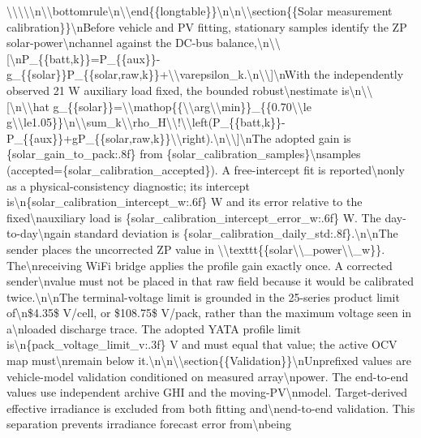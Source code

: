 \documentclass[a4paper,11pt]{article}
\begin{document}
\begin{enumerate}[leftmargin=1.8em]
\textbackslash{}\textbackslash{}\textbackslash{}\textbackslash{}\textbackslash{}n\textbackslash{}\textbackslash{}bottomrule\textbackslash{}n\textbackslash{}\textbackslash{}end\{\{longtable\}\}\textbackslash{}n\textbackslash{}n\textbackslash{}\textbackslash{}section\{\{Solar measurement calibration\}\}\textbackslash{}nBefore vehicle and PV fitting, stationary samples identify the ZP solar-power\textbackslash{}nchannel against the DC-bus balance,\textbackslash{}n\textbackslash{}\textbackslash{}[\textbackslash{}nP\_\{\{batt,k\}\}=P\_\{\{aux\}\}-g\_\{\{solar\}\}P\_\{\{solar,raw,k\}\}+\textbackslash{}\textbackslash{}varepsilon\_k.\textbackslash{}n\textbackslash{}\textbackslash{}]\textbackslash{}nWith the independently observed 21 W auxiliary load fixed, the bounded robust\textbackslash{}nestimate is\textbackslash{}n\textbackslash{}\textbackslash{}[\textbackslash{}n\textbackslash{}\textbackslash{}hat g\_\{\{solar\}\}=\textbackslash{}\textbackslash{}mathop\{\{\textbackslash{}\textbackslash{}arg\textbackslash{}\textbackslash{}min\}\}\_\{\{0.70\textbackslash{}\textbackslash{}le g\textbackslash{}\textbackslash{}le1.05\}\}\textbackslash{}n\textbackslash{}\textbackslash{}sum\_k\textbackslash{}\textbackslash{}rho\_H\textbackslash{}\textbackslash{}!\textbackslash{}\textbackslash{}left(P\_\{\{batt,k\}\}-P\_\{\{aux\}\}+gP\_\{\{solar,raw,k\}\}\textbackslash{}\textbackslash{}right).\textbackslash{}n\textbackslash{}\textbackslash{}]\textbackslash{}nThe adopted gain is \{solar\_gain\_to\_pack:.8f\} from \{solar\_calibration\_samples\}\textbackslash{}nsamples (accepted=\{solar\_calibration\_accepted\}). A free-intercept fit is reported\textbackslash{}nonly as a physical-consistency diagnostic; its intercept is\textbackslash{}n\{solar\_calibration\_intercept\_w:.6f\} W and its error relative to the fixed\textbackslash{}nauxiliary load is \{solar\_calibration\_intercept\_error\_w:.6f\} W. The day-to-day\textbackslash{}ngain standard deviation is \{solar\_calibration\_daily\_std:.8f\}.\textbackslash{}n\textbackslash{}nThe sender places the uncorrected ZP value in \textbackslash{}\textbackslash{}texttt\{\{solar\textbackslash{}\textbackslash{}\_power\textbackslash{}\textbackslash{}\_w\}\}. The\textbackslash{}nreceiving WiFi bridge applies the profile gain exactly once. A corrected sender\textbackslash{}nvalue must not be placed in that raw field because it would be calibrated twice.\textbackslash{}n\textbackslash{}nThe terminal-voltage limit is grounded in the 25-series product limit of\textbackslash{}n\$4.35\$ V/cell, or \$108.75\$ V/pack, rather than the maximum voltage seen in a\textbackslash{}nloaded discharge trace. The adopted YATA profile limit is\textbackslash{}n\{pack\_voltage\_limit\_v:.3f\} V and must equal that value; the active OCV map must\textbackslash{}nremain below it.\textbackslash{}n\textbackslash{}n\textbackslash{}\textbackslash{}section\{\{Validation\}\}\textbackslash{}nUnprefixed values are vehicle-model validation conditioned on measured array\textbackslash{}npower. The end-to-end values use independent archive GHI and the moving-PV\textbackslash{}nmodel. Target-derived effective irradiance is excluded from both fitting and\textbackslash{}nend-to-end validation. This separation prevents irradiance forecast error from\textbackslash{}nbeing 
\end{enumerate}
\end{document}

